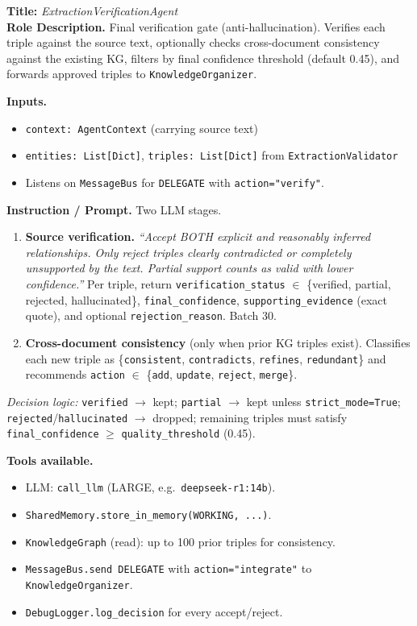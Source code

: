 \documentclass{article}
\begin{document}
\begin{agentbox}
\textbf{Title:} \textit{ExtractionVerificationAgent}\\
\textbf{Role Description.} Final verification gate
(anti-hallucination). Verifies each triple against the source text,
optionally checks cross-document consistency against the existing KG,
filters by final confidence threshold (default 0.45), and forwards
approved triples to \texttt{KnowledgeOrganizer}.

\textbf{Inputs.}
\begin{itemize}[leftmargin=*,nosep]
\item \texttt{context: AgentContext} (carrying source text)
\item \texttt{entities: List[Dict]}, \texttt{triples: List[Dict]} from \texttt{ExtractionValidator}
\item Listens on \texttt{MessageBus} for \texttt{DELEGATE} with \texttt{action="verify"}.
\end{itemize}

\textbf{Instruction / Prompt.} Two LLM stages.
\begin{enumerate}[leftmargin=*,nosep]
\item \textbf{Source verification.} \textit{``Accept BOTH explicit and reasonably inferred relationships. Only reject triples clearly contradicted or completely unsupported by the text. Partial support counts as valid with lower confidence.''} Per triple, return \texttt{verification\_status} $\in$ \{verified, partial, rejected, hallucinated\}, \texttt{final\_confidence}, \texttt{supporting\_evidence} (exact quote), and optional \texttt{rejection\_reason}. Batch 30.
\item \textbf{Cross-document consistency} (only when prior KG triples exist). Classifies each new triple as \{\texttt{consistent}, \texttt{contradicts}, \texttt{refines}, \texttt{redundant}\} and recommends \texttt{action} $\in$ \{\texttt{add}, \texttt{update}, \texttt{reject}, \texttt{merge}\}.
\end{enumerate}
\textit{Decision logic:} \texttt{verified} $\rightarrow$ kept; \texttt{partial} $\rightarrow$ kept unless \texttt{strict\_mode=True}; \texttt{rejected}/\texttt{hallucinated} $\rightarrow$ dropped; remaining triples must satisfy \texttt{final\_confidence} $\ge$ \texttt{quality\_threshold} (0.45).

\textbf{Tools available.}
\begin{itemize}[leftmargin=*,nosep]
\item LLM: \texttt{call\_llm} (LARGE, e.g.\ \texttt{deepseek-r1:14b}).
\item \texttt{SharedMemory.store\_in\_memory(WORKING, ...)}.
\item \texttt{KnowledgeGraph} (read): up to 100 prior triples for consistency.
\item \texttt{MessageBus.send DELEGATE} with \texttt{action="integrate"} to \texttt{KnowledgeOrganizer}.
\item \texttt{DebugLogger.log\_decision} for every accept/reject.
\end{itemize}


\end{agentbox}
\end{document}
